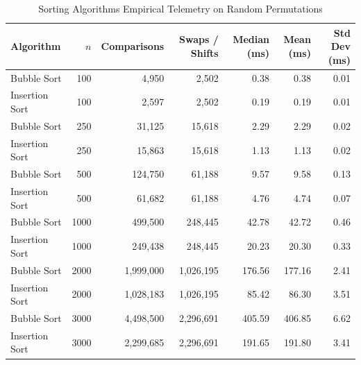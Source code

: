 \begin{table}[htbp]
\centering
\caption{Sorting Algorithms Empirical Telemetry on Random Permutations}
\label{tab:sorting_random_summary}
\small
\begin{tabular*}{\textwidth}{@{\extracolsep{\fill}}lrrrrrr}
\toprule
\textbf{Algorithm} & $n$ & \textbf{Comparisons} & \textbf{Swaps / Shifts} & \textbf{Median (ms)} & \textbf{Mean (ms)} & \textbf{Std Dev (ms)} \\
\midrule
Bubble Sort & 100 & 4,950 & 2,502 & 0.38 & 0.38 & 0.01 \\
Insertion Sort & 100 & 2,597 & 2,502 & 0.19 & 0.19 & 0.01 \\
Bubble Sort & 250 & 31,125 & 15,618 & 2.29 & 2.29 & 0.02 \\
Insertion Sort & 250 & 15,863 & 15,618 & 1.13 & 1.13 & 0.02 \\
Bubble Sort & 500 & 124,750 & 61,188 & 9.57 & 9.58 & 0.13 \\
Insertion Sort & 500 & 61,682 & 61,188 & 4.76 & 4.74 & 0.07 \\
Bubble Sort & 1000 & 499,500 & 248,445 & 42.78 & 42.72 & 0.46 \\
Insertion Sort & 1000 & 249,438 & 248,445 & 20.23 & 20.30 & 0.33 \\
Bubble Sort & 2000 & 1,999,000 & 1,026,195 & 176.56 & 177.16 & 2.41 \\
Insertion Sort & 2000 & 1,028,183 & 1,026,195 & 85.42 & 86.30 & 3.51 \\
Bubble Sort & 3000 & 4,498,500 & 2,296,691 & 405.59 & 406.85 & 6.62 \\
Insertion Sort & 3000 & 2,299,685 & 2,296,691 & 191.65 & 191.80 & 3.41 \\
\bottomrule
\end{tabular*}
\end{table}
